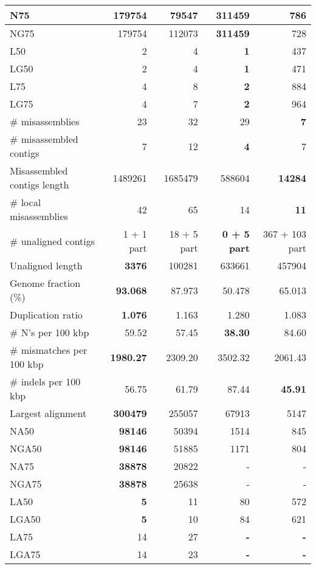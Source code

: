 \documentclass[12pt,a4paper]{article}
\begin{document}
\begin{table}[ht]
\begin{center}
\begin{tabular}{|l*{4}{|r}|}
N75 & 179754 & 79547 & {\bf 311459} & 786 \\ \hline
NG75 & 179754 & 112073 & {\bf 311459} & 728 \\ \hline
L50 & 2 & 4 & {\bf 1} & 437 \\ \hline
LG50 & 2 & 4 & {\bf 1} & 471 \\ \hline
L75 & 4 & 8 & {\bf 2} & 884 \\ \hline
LG75 & 4 & 7 & {\bf 2} & 964 \\ \hline
\# misassemblies & 23 & 32 & 29 & {\bf 7} \\ \hline
\# misassembled contigs & 7 & 12 & {\bf 4} & 7 \\ \hline
Misassembled contigs length & 1489261 & 1685479 & 588604 & {\bf 14284} \\ \hline
\# local misassemblies & 42 & 65 & 14 & {\bf 11} \\ \hline
\# unaligned contigs & 1 + 1 part & 18 + 5 part & {\bf 0 + 5 part} & 367 + 103 part \\ \hline
Unaligned length & {\bf 3376} & 100281 & 633661 & 457904 \\ \hline
Genome fraction (\%) & {\bf 93.068} & 87.973 & 50.478 & 65.013 \\ \hline
Duplication ratio & {\bf 1.076} & 1.163 & 1.280 & 1.083 \\ \hline
\# N's per 100 kbp & 59.52 & 57.45 & {\bf 38.30} & 84.60 \\ \hline
\# mismatches per 100 kbp & {\bf 1980.27} & 2309.20 & 3502.32 & 2061.43 \\ \hline
\# indels per 100 kbp & 56.75 & 61.79 & 87.44 & {\bf 45.91} \\ \hline
Largest alignment & {\bf 300479} & 255057 & 67913 & 5147 \\ \hline
NA50 & {\bf 98146} & 50394 & 1514 & 845 \\ \hline
NGA50 & {\bf 98146} & 51885 & 1171 & 804 \\ \hline
NA75 & {\bf 38878} & 20822 & - & - \\ \hline
NGA75 & {\bf 38878} & 25638 & - & - \\ \hline
LA50 & {\bf 5} & 11 & 80 & 572 \\ \hline
LGA50 & {\bf 5} & 10 & 84 & 621 \\ \hline
LA75 & 14 & 27 & {\bf -} & {\bf -} \\ \hline
LGA75 & 14 & 23 & {\bf -} & {\bf -} \\ \hline
\end{tabular}
\end{center}
\end{table}
\end{document}
